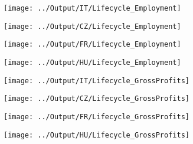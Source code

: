 \documentclass[12pt,notitlepage]{article}
\begin{document}
\begin{figure}[!htpb]
\centering
\caption{Firm age and Employment}
\begin{subfigure}{.49\textwidth}
    \centering
 \texttt{[image: ../Output/IT/Lifecycle\_Employment]}
\end{subfigure}%
\begin{subfigure}{.49\textwidth}
    \centering
 \texttt{[image: ../Output/CZ/Lifecycle\_Employment]}
\end{subfigure}
\begin{subfigure}{.49\textwidth}
    \centering
 \texttt{[image: ../Output/FR/Lifecycle\_Employment]}
\end{subfigure}%
\begin{subfigure}{.49\textwidth}
    \centering
 \texttt{[image: ../Output/HU/Lifecycle\_Employment]}
\end{subfigure}
\end{figure}
\pagebreak

\begin{figure}[!htpb]
\centering
\caption{Firm age and Gross Profits}
\begin{subfigure}{.49\textwidth}
    \centering
 \texttt{[image: ../Output/IT/Lifecycle\_GrossProfits]}
\end{subfigure}%
\begin{subfigure}{.49\textwidth}
    \centering
 \texttt{[image: ../Output/CZ/Lifecycle\_GrossProfits]}
\end{subfigure}
\begin{subfigure}{.49\textwidth}
    \centering
 \texttt{[image: ../Output/FR/Lifecycle\_GrossProfits]}
\end{subfigure}%
\begin{subfigure}{.49\textwidth}
    \centering
 \texttt{[image: ../Output/HU/Lifecycle\_GrossProfits]}
\end{subfigure}
\end{figure}
\pagebreak
\end{document}
